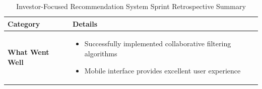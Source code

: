 \begin{table}[htbp]
    \centering
    \begin{tabular}{|p{3cm}|p{10cm}|}
        \hline
        \textbf{Category} & \textbf{Details} \\
        \hline
        \textbf{What Went Well} & 
        \begin{itemize}
            \item Successfully implemented collaborative filtering algorithms
            \item Mobile interface provides excellent user experience
        \end{itemize} \\
        \hline
    \end{tabular}
    \caption{Investor-Focused Recommendation System Sprint Retrospective Summary}
    \label{tab:recommendation-retrospective}
\end{table}






